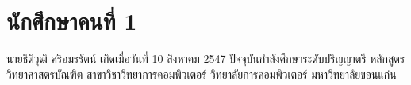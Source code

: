 
\section*{นักศึกษาคนที่ 1}

นายธิติวุฒิ ศรีอมรรัตน์ เกิดเมื่อวันที่ 10 สิงหาคม 2547 ปัจจุบันกำลังศึกษาระดับปริญญาตรี หลักสูตรวิทยาศาสตรบัณฑิต สาขาวิชาวิทยาการคอมพิวเตอร์ วิทยาลัยการคอมพิวเตอร์ มหาวิทยาลัยขอนแก่น 